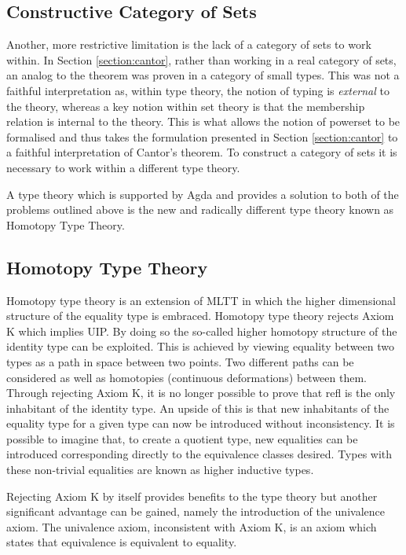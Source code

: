 \subsection{Constructive Category of Sets}
\label{section:hott}
Another, more restrictive limitation is the lack of a category of sets to work
within. In Section \ref{section:cantor}, rather than working in a
real category of sets, an analog to the theorem was proven in a category of
small types. This was not a faithful interpretation as, within type theory, the
notion of typing is \textit{external} to the theory, whereas a key notion within
set theory is that the membership relation is internal to the theory. This is
what allows the notion of powerset to be formalised and thus takes the
formulation presented in Section \ref{section:cantor} to a faithful
interpretation of Cantor's theorem. To construct a category of
sets it is necessary to work within a different type theory.

A type theory which is supported by Agda and provides a solution to both of the
problems outlined above is the new and radically different type theory known as
Homotopy Type Theory.

\subsection{Homotopy Type Theory}

Homotopy type theory is an extension of MLTT in which the
higher dimensional structure of the equality type is embraced. Homotopy type
theory rejects \textsf{Axiom K} which implies UIP. By doing so the so-called higher
homotopy structure of the identity type can be exploited. This is achieved by
viewing equality between two types as a path in space between two points. Two
different paths can be considered as well as homotopies (continuous
deformations) between them. Through rejecting \textsf{Axiom K}, it is no longer
possible to prove that \textsf{refl} is the only inhabitant of the identity
type. An upside of this is that new inhabitants of the equality type for a given
type can now be introduced without inconsistency. It is possible to imagine
that, to create a quotient type, new equalities can be introduced corresponding
directly to the equivalence classes desired. Types with these non-trivial
equalities are known as higher inductive types.

Rejecting \textsf{Axiom K} by itself provides benefits to the type theory but
another significant advantage can be gained, namely the introduction of the
univalence axiom. The univalence axiom, inconsistent with
\textsf{Axiom K}, is an axiom which states that equivalence is equivalent to
equality.

